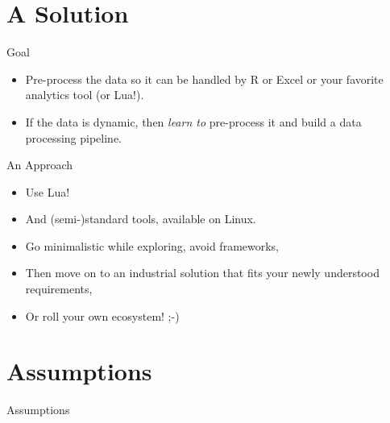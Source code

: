 \documentclass[handout]{beamer}
\begin{document}

\section{A Solution}


\begin{frame}{Goal}

\begin{itemize}
\item Pre-process the data so it can be handled by R or Excel or your favorite
analytics tool (or Lua!).
\item If the data is dynamic, then \textit{learn to} pre-process it
      and build a data processing pipeline.
\end{itemize}

\end{frame}


\begin{frame}{An Approach}

\begin{itemize}
\item Use Lua!
\item And (semi-)standard tools, available on Linux.
\item Go minimalistic while exploring, avoid frameworks,
\item Then move on to an industrial solution that fits your newly understood
      requirements,
\item Or roll your own ecosystem! ;-)
\end{itemize}

\end{frame}


\section{Assumptions}


\begin{frame}
\huge Assumptions
\end{frame}
\end{document}
